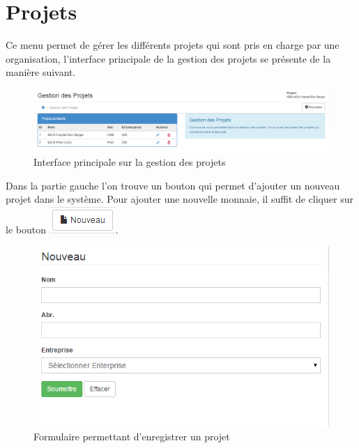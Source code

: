\documentclass[12pt,a4paper]{report}
\begin{document}
\newpage
\section{Projets}
Ce menu permet de gérer les différents projets qui sont pris en charge par une organisation, l'interface principale de la gestion des projets se présente de la manière suivant.

\begin{figure}[h]
\begin{center}
\includegraphics[width=16cm]{pic/AdminProject.png}
\end{center}
\caption{Interface principale sur la gestion des projets}
\label{Interface principale sur la gestion des projets}
\end{figure}


Dans la partie gauche l'on trouve un bouton qui permet d'ajouter un nouveau projet dans le système. Pour ajouter une nouvelle monnaie, il suffit de cliquer sur le bouton \includegraphics[scale=0.7]{pic/NewProject.png}.

\begin{figure}[h]
\begin{center}
\includegraphics[width=13cm]{pic/FormNewProj.png}
\end{center}
\caption{Formulaire permettant d'enregistrer un projet}
\label{Formulaire permettant d'enregistrer un projet}
\end{figure}
\end{document}
